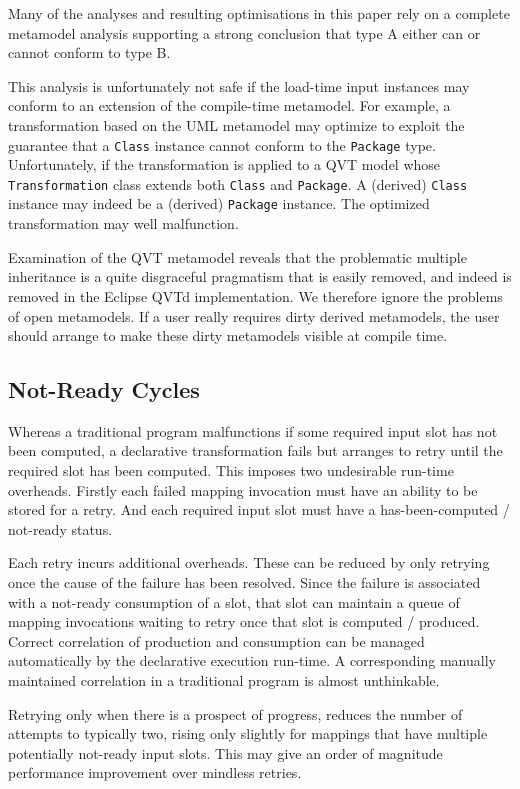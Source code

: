 \documentclass{jot}
\begin{document}
Many of the analyses and resulting optimisations in this paper rely on a complete metamodel analysis supporting a strong conclusion that type A either can or cannot conform to type B.

This analysis is unfortunately not safe if the load-time input instances may conform to an extension of the compile-time metamodel. For example, a transformation based on the UML metamodel may optimize to exploit the guarantee that a \verb|Class| instance cannot conform to the \verb|Package| type. Unfortunately, if the transformation is applied to a QVT model whose \verb|Transformation| class extends both \verb|Class| and \verb|Package|. A (derived) \verb|Class| instance may indeed be a (derived) \verb|Package| instance. The optimized transformation may well malfunction.

Examination of the QVT metamodel reveals that the problematic multiple inheritance is a quite disgraceful pragmatism that is easily removed, and indeed is removed in the Eclipse QVTd implementation. We therefore ignore the problems of open metamodels. If a user really requires dirty derived metamodels, the user should arrange to make these dirty metamodels visible at compile time.

\subsection{Not-Ready Cycles}

Whereas a traditional program malfunctions if some required input slot has not been computed, a declarative transformation fails but arranges to retry until the required slot has been computed. This imposes two undesirable run-time overheads. Firstly each failed mapping invocation must have an ability to be stored for a retry. And each required input slot must have a has-been-computed / not-ready status.

Each retry incurs additional overheads. These can be reduced by only retrying once the cause of the failure has been resolved. Since the failure is associated with a not-ready consumption of a slot, that slot can maintain a queue of mapping invocations waiting to retry once that slot is computed / produced. Correct correlation of production and consumption can be managed automatically by the declarative execution run-time. A corresponding manually maintained correlation in a traditional program is almost unthinkable.

Retrying only when there is a prospect of progress, reduces the number of attempts to typically two, rising only slightly for mappings that have multiple potentially not-ready input slots. This may give an order of magnitude performance improvement over mindless retries.
\end{document}
